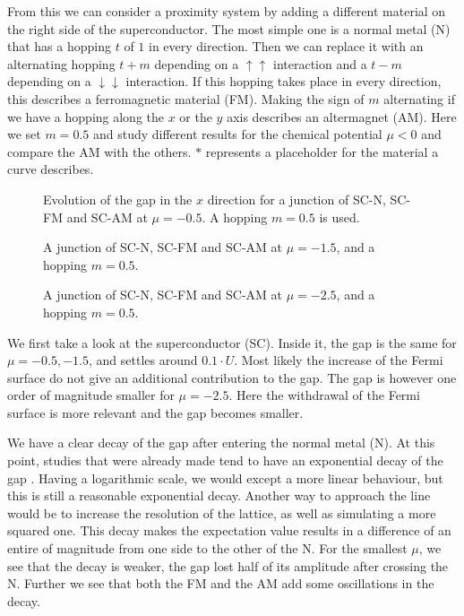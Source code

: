 \documentclass[..\main.tex]{subfile}
\begin{document}
From this we can consider a proximity system by adding a different material on the right side of the superconductor. 
The most simple one is a normal metal (N) that has a hopping $t$ of $1$ in every direction.
Then we can replace it with an alternating hopping $t+m$ depending on a $\uparrow\uparrow$ interaction
and a $t-m$ depending on a $\downarrow\downarrow$ interaction. If this hopping takes place in every direction, this describes a ferromagnetic material (FM).
Making the sign of $m$ alternating if we have a hopping along the $x$ or the $y$ axis describes an altermagnet (AM).
Here we set $m=0.5$ and study different results for the chemical potential $\mu<0$ and compare the AM
with the others. $\ast$ represents a placeholder for the material a curve describes.\\
\begin{figure}[H]
  \centering
  
  \caption{Evolution of the gap in the $x$ direction for a junction of SC-N, SC-FM and SC-AM at $\mu=-0.5$. A hopping $m=0.5$ is used.}
  \label{fig:SC_START_Mu-0.5}
\end{figure}\begin{figure}[H]
  \centering
  
  \caption{A junction of SC-N, SC-FM and SC-AM at $\mu=-1.5$, and a hopping $m=0.5$.}
  \label{fig:SC_START_Mu-1.5}
\end{figure}
\begin{figure}[H]
  \centering
  
  \caption{A junction of SC-N, SC-FM and SC-AM at $\mu=-2.5$, and a hopping $m=0.5$.}
    \label{fig:SC_START_Mu-2.5}
\end{figure}
We first take a look at the superconductor (SC). Inside it, the gap is the same for $\mu=-0.5,-1.5$,
and settles around $0.1\cdot U$. Most likely the increase of the Fermi surface do not give an additional contribution to the gap.
The gap is however one order of magnitude smaller for $\mu=-2.5$. Here the withdrawal of the Fermi surface is more relevant and the 
gap becomes smaller.

We have a clear decay of the gap after entering the normal metal (N). At this point, 
studies that were already made tend to have an exponential decay of the gap \cite{Mjos2019}. Having a logarithmic scale, we would
except a more linear behaviour, but this is still a reasonable exponential decay. Another way to approach the line would be to increase the 
resolution of the lattice, as well as simulating a more squared one. This decay makes the expectation value results in a difference of an entire
of magnitude from one side to the other of the N. For the smallest $\mu$, we see that the decay is weaker, the gap lost
half of its amplitude after crossing the N. Further we see that both the FM and the AM add some oscillations in the decay. \\
\end{document}
